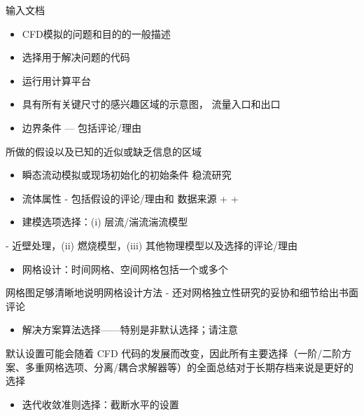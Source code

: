 \documentclass[11pt,a4paper,openany,fontset=none]{ctexbook}
\begin{document}
输入文档

\begin{itemize}

\item CFD模拟的问题和目的的一般描述

\item 选择用于解决问题的代码

\item 运行用计算平台

\item 具有所有关键尺寸的感兴趣区域的示意图， 流量入口和出口

\item 边界条件 — 包括评论/理由

\end{itemize}

所做的假设以及已知的近似或缺乏信息的区域

\begin{itemize}

\item 瞬态流动模拟或现场初始化的初始条件 稳流研究

\item 流体属性 - 包括假设的评论/理由和 数据来源 + +

\item 建模选项选择：(i) 层流/湍流湍流模型

\end{itemize}

- 近壁处理，(ii) 燃烧模型，(iii) 其他物理模型以及选择的评论/理由

\begin{itemize}

\item 网格设计：时间网格、空间网格包括一个或多个

\end{itemize}

网格图足够清晰地说明网格设计方法 - 还对网格独立性研究的妥协和细节给出书面评论

\begin{itemize}

\item 解决方案算法选择——特别是非默认选择；请注意

\end{itemize}

默认设置可能会随着 CFD 代码的发展而改变，因此所有主要选择（一阶/二阶方案、多重网格选项、分离/耦合求解器等）的全面总结对于长期存档来说是更好的选择

\begin{itemize}

\item 迭代收敛准则选择：截断水平的设置

\end{itemize}
\end{document}
